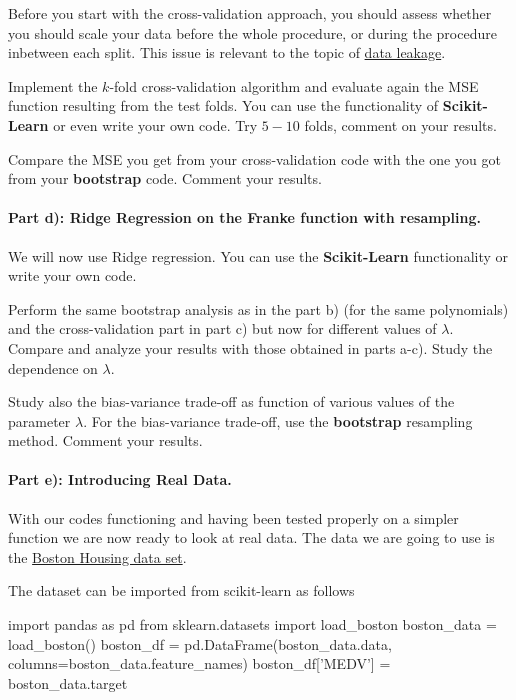\documentclass[%
oneside,                 %
final,                   %
10pt]{article}
\begin{document}
Before you start with the cross-validation approach, you should assess
whether you should scale your data before the whole procedure, or
during the procedure inbetween each split. This issue is relevant to
the topic of \href{{https://en.wikipedia.org/wiki/Leakage_(machine_learning)}}{data leakage}.

Implement the $k$-fold cross-validation algorithm
and evaluate again the MSE function resulting
from the test folds. You can use the functionality of
\textbf{Scikit-Learn} or even write your own code.
Try $5-10$ folds, comment on your results.

Compare the MSE you get from your cross-validation code with the one
you got from your \textbf{bootstrap} code. Comment your results.

\paragraph{Part d): Ridge Regression on the Franke function  with resampling.}
We will now use Ridge regression. You can use the \textbf{Scikit-Learn}
functionality or write your own code.

Perform the same bootstrap analysis as in the
part b)  (for the same polynomials) and the cross-validation part in part c) but now for different values of $\lambda$. Compare and
analyze your results with those obtained in parts a-c). Study the
dependence on $\lambda$.

Study also the bias-variance trade-off as function of various values of
the parameter $\lambda$. For the bias-variance trade-off, use the \textbf{bootstrap} resampling method. Comment your results. 

\paragraph{Part e): Introducing Real Data.}
With our codes functioning and having been tested properly on a
simpler function we are now ready to look at real data.
The data we are going to use is the
\href{{https://www.cs.toronto.edu/~delve/data/boston/bostonDetail.html}}{Boston Housing data set}.

The dataset can be imported from scikit-learn as follows






\bpycod
    import pandas as pd
    from sklearn.datasets import load_boston
    boston_data = load_boston()
    boston_df = pd.DataFrame(boston_data.data, columns=boston_data.feature_names)
    boston_df['MEDV'] = boston_data.target
\end{document}
